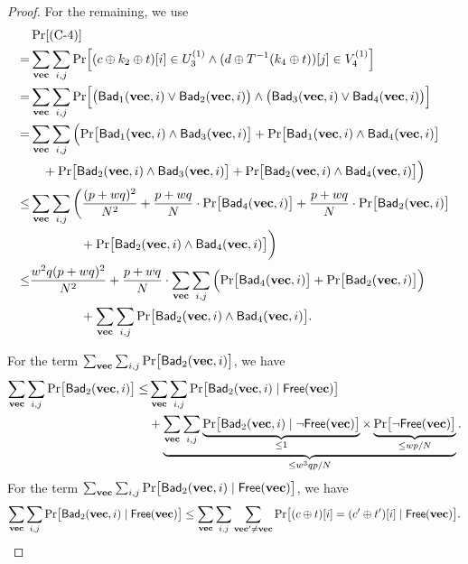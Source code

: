 \begin{proof}
For the remaining, we use
%
\begin{align*}
&\Pr[\cfour]   \\
= &\sum_{\vect}\sum_{i,j}{\Pr}\Big[(c\xor k_2\xor t)[i]\in U_3^{(1)}\wedge(d\xor T^{-1}(k_4\xor t))[j]\in V_4^{(1)}\Big]       \\
= &\sum_{\vect}\sum_{i,j}{\Pr}\Big[\big(\pred_1(\vect,i)\vee\pred_2(\vect,i)\big)\wedge\big(\pred_3(\vect,i)\vee\pred_4(\vect,i)\big)\Big]        \\
= &\sum_{\vect}\sum_{i,j}\Big({\Pr}\big[\pred_1(\vect,i)\wedge\pred_3(\vect,i)\big]
+{\Pr}\big[\pred_1(\vect,i)\wedge\pred_4(\vect,i)\big]        \\
&\ \ \  +{\Pr}\big[\pred_2(\vect,i)\wedge\pred_3(\vect,i)\big]
+{\Pr}\big[\pred_2(\vect,i)\wedge\pred_4(\vect,i)\big]\Big)       \\
\leq &\sum_{\vect}\sum_{i,j}\bigg(\frac{(p+wq)^2}{N^2}+
\frac{p+wq}{N}\cdot
{\Pr}\big[\pred_4(\vect,i)\big]      +\frac{p+wq}{N}\cdot
{\Pr}\big[\pred_2(\vect,i)\big]   \\
&\ \ \ \ \ \ \ \ \ \ \ \ 
+{\Pr}\big[\pred_2(\vect,i)\wedge\pred_4(\vect,i)\big]\bigg)      \\
\leq &
%
\frac{w^2q(p+wq)^2}{N^2}+
\frac{p+wq}{N}\cdot
\sum_{\vect}\sum_{i,j}\Big(
{\Pr}\big[\pred_4(\vect,i)\big]     +
{\Pr}\big[\pred_2(\vect,i)\big]   \Big)   \\
&\ \ \ \ \ \ \ \ \ \ \ \ 
+
\sum_{\vect}\sum_{i,j}{\Pr}\big[\pred_2(\vect,i)\wedge\pred_4(\vect,i)\big].
\end{align*}
%
%

For the term $\sum_{\mathbf{vec}}\sum_{i,j}{\Pr}\big[\mathsf{Bad}_2(\mathbf{vec},i)\big]$, we have
%
\begin{align*}
\sum_{\vect}\sum_{i,j}{\Pr}\big[\pred_2(\vect,i)\big]  
\leq &  \sum_{\vect}\sum_{i,j}
	{\Pr}\big[\pred_2(\vect,i)\mid\free(\vect)\big]        \\
%
&+\underbrace{\sum_{\vect}\sum_{i,j} \underbrace{{\Pr}\big[\pred_2(\vect,i)\mid\neg\free(\vect)\big]}_{\leq 1}
	\times \underbrace{{\Pr}\big[\neg\free(\vect)\big]}_{\leq wp/N}}_{\leq w^3qp/N} .
\end{align*}
%
For the term $\sum_{\mathbf{vec}}\sum_{i,j}
{\Pr}\big[\mathsf{Bad}_2(\mathbf{vec},i)\mid\mathsf{Free}(\mathbf{vec})\big]$, we have
%
\begin{align*}
\sum_{\mathbf{vec}}\sum_{i,j}
{\Pr}\big[\mathsf{Bad}_2(\mathbf{vec},i)\mid\mathsf{Free}(\mathbf{vec})\big] 
\leq   \sum_{\mathbf{vec}}\sum_{i,j} \sum_{\mathbf{vec}'\neq\mathbf{vec}}
{\Pr}\big[(c\oplus t)[i]=(c'\oplus t')[i]\mid\mathsf{Free}(\mathbf{vec})\big]    .
\end{align*}
%


\end{proof}
